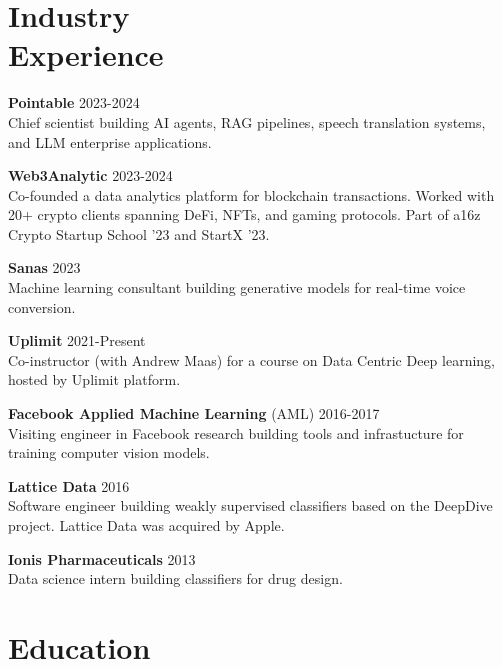 \documentclass[margin, 10pt]{res} %
\begin{document}
\begin{resume}


\section{Industry \\ Experience}

\textbf{Pointable}  \hfill 2023-2024 \\
Chief scientist building AI agents, RAG pipelines, speech translation systems, and LLM enterprise applications.

\textbf{Web3Analytic}  \hfill 2023-2024 \\
Co-founded a data analytics platform for blockchain transactions. Worked with 20+ crypto clients spanning DeFi, NFTs, and gaming protocols. Part of a16z Crypto Startup School '23 and StartX '23.  

\textbf{Sanas}  \hfill 2023 \\
Machine learning consultant building generative models for real-time voice conversion.

\textbf{Uplimit}  \hfill 2021-Present \\
Co-instructor (with Andrew Maas) for a course on Data Centric Deep learning, hosted by Uplimit platform.

\textbf{Facebook Applied Machine Learning} (AML) \hfill 2016-2017 \\
Visiting engineer in Facebook research building tools and infrastucture for training computer vision models.

\textbf{Lattice Data} \hfill 2016 \\
Software engineer building weakly supervised classifiers based on the DeepDive project. Lattice Data was acquired by Apple.

\textbf{Ionis Pharmaceuticals} \hfill 2013 \\
Data science intern building classifiers for drug design.


\section{Education}


\end{resume}
\end{document}
